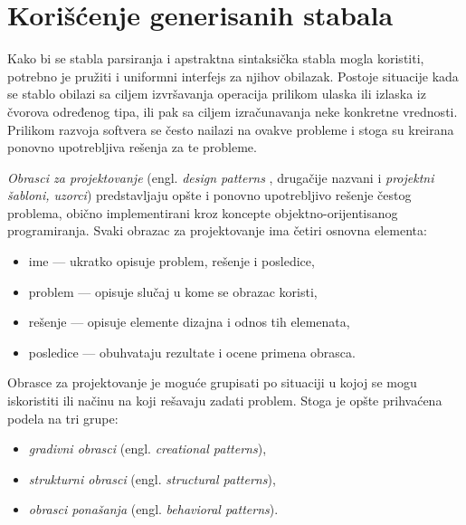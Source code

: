 \section{Korišćenje generisanih stabala}
\label{sec:DesignPatterns}

Kako bi se stabla parsiranja i apstraktna sintaksička stabla mogla koristiti, potrebno je pružiti i uniformni interfejs za njihov obilazak. Postoje situacije kada se stablo obilazi sa ciljem izvršavanja operacija prilikom ulaska ili izlaska iz čvorova određenog tipa, ili pak sa ciljem izračunavanja neke konkretne vrednosti. Prilikom razvoja softvera se često nailazi na ovakve probleme i stoga su kreirana ponovno upotrebljiva rešenja za te probleme. 

\emph{Obrasci za projektovanje} (engl. \emph{design patterns} \cite{DesignPatternsBook}, drugačije nazvani i \emph{projektni šabloni, uzorci}) predstavljaju opšte i ponovno upotrebljivo rešenje čestog problema, obično implementirani kroz koncepte objektno-orijentisanog programiranja. Svaki obrazac za projektovanje ima četiri osnovna elementa:
\begin{itemize}
    \item ime --- ukratko opisuje problem, rešenje i posledice,
    \item problem --- opisuje slučaj u kome se obrazac koristi,
    \item rešenje --- opisuje elemente dizajna i odnos tih elemenata,
    \item posledice --- obuhvataju rezultate i ocene primena obrasca.
\end{itemize}

Obrasce za projektovanje je moguće grupisati po situaciji u kojoj se mogu iskoristiti ili načinu na koji rešavaju zadati problem. Stoga je opšte prihvaćena podela na tri grupe:
\begin{itemize}
    \item \emph{gradivni obrasci} (engl. \emph{creational patterns}),
    \item \emph{strukturni obrasci} (engl. \emph{structural patterns}),
    \item \emph{obrasci ponašanja} (engl. \emph{behavioral patterns}).
\end{itemize}

